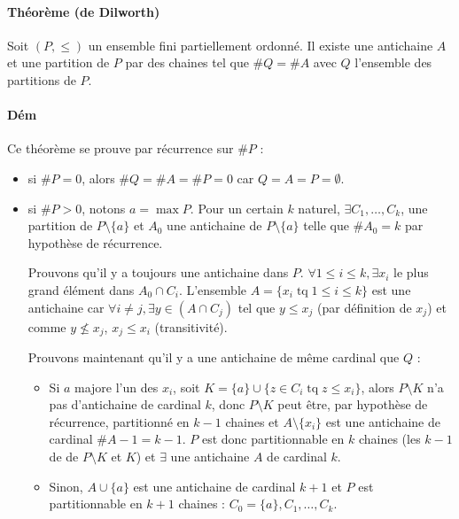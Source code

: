 \documentclass{article}
\DeclareMathOperator{\tq}{\text{ tq }}
\begin{document}
			\paragraph{Théorème (de Dilworth)} Soit $(P, \leq)$ un ensemble fini partiellement ordonné. Il existe une antichaine $A$ et une partition
			de $P$ par des chaines tel que $\#Q = \#A$ avec $Q$ l'ensemble des partitions de $P$.

			\paragraph{Dém} Ce théorème se prouve par récurrence sur $\#P$ :
				\begin{itemize}
					\item si $\#P = 0$, alors $\#Q = \#A = \#P = 0$ car $Q = A = P = \emptyset$.
					\item si $\#P > 0$, notons $a = \max P$. Pour un certain $k$ naturel, $\exists C_1, \ldots, C_k$, une partition de
						  $P \setminus \{a\}$ et $A_0$ une antichaine de $P \setminus \{a\}$ telle que $\#A_0 = k$ par hypothèse de récurrence.

						  Prouvons qu'il y a toujours une antichaine dans $P$. $\forall 1 \leq i \leq k, \exists x_i$ le plus grand élément dans
						  $A_0 \cap C_i$. L'ensemble $A = \{x_i \tq 1 \leq i \leq k\}$ est une antichaine car
						  $\forall i \neq j, \exists y \in (A \cap C_j)$ tel que $y \leq x_j$ (par définition de $x_j$) et comme
						  $y \not \leq x_j$, $x_j \leq x_i$ (transitivité).

						  Prouvons maintenant qu'il y a une antichaine de même cardinal que $Q$ :
						  \begin{itemize}
							\item Si $a$ majore l'un des $x_i$, soit $K = \{a\} \cup \{z \in C_i \tq z \leq x_i\}$, alors $P \setminus K$ n'a pas
								  d'antichaine de cardinal $k$, donc $P \setminus K$ peut être, par hypothèse de récurrence, partitionné en $k-1$
								  chaines et $A \setminus \{x_i\}$ est une antichaine de cardinal $\#A - 1 = k-1$. $P$ est donc partitionnable en $k$
								  chaines (les $k-1$ de de $P \setminus K$ et $K$) et $\exists$ une antichaine $A$ de cardinal $k$.
							\item Sinon, $A \cup \{a\}$ est une antichaine de cardinal $k+1$ et $P$ est partitionnable en $k+1$ chaines :
								  $C_0 = \{a\}, C_1, \ldots, C_k$.
						  \end{itemize}
				\end{itemize}
\end{document}
